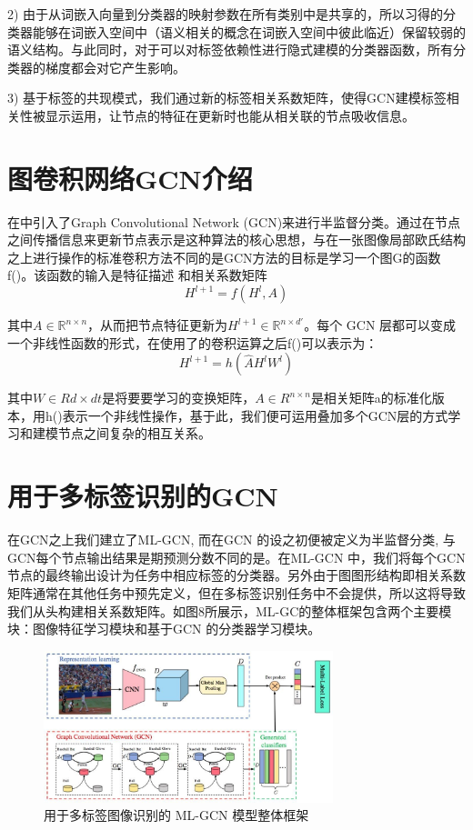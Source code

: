 2) 由于从词嵌入向量到分类器的映射参数在所有类别中是共享的，所以习得的分类器能够在词嵌入空间中（语义相关的概念在词嵌入空间中彼此临近）保留较弱的语义结构。与此同时，对于可以对标签依赖性进行隐式建模的分类器函数，所有分类器的梯度都会对它产生影响。

3) 基于标签的共现模式，我们通过新的标签相关系数矩阵，使得GCN建模标签相关性被显示运用，让节点的特征在更新时也能从相关联的节点吸收信息。

\section{图卷积网络GCN介绍}
在\cite{Li2014Multi}中引入了Graph Convolutional Network (GCN)来进行半监督分类。通过在节点之间传播信息来更新节点表示是这种算法的核心思想，与在一张图像局部欧氏结构之上进行操作的标准卷积方法不同的是GCN方法的目标是学习一个图G的函数f()。该函数的输入是特征描述  和相关系数矩阵
\begin{equation}
\label{dscNoStgProof0}
H^{l+1} = f(H^l, A)
\end{equation}

其中$A\in \mathbb{R}^{n\times n}$，从而把节点特征更新为$H^{l+1}\in \mathbb{R}^{n\times d'}$。每个 GCN 层都可以变成一个非线性函数的形式，在使用了\cite{Li2014Multi}的卷积运算之后f()可以表示为：
\begin{equation}
\label{dscNoStgProof0}
H^{l+1} = h(\hat{A}H^l W^l)
\end{equation}

其中$W\in Rd\times dt$是将要要学习的变换矩阵，$A\in R^{n\times n}$是相关矩阵a的标准化版本，用h()表示一个非线性操作，基于此，我们便可运用叠加多个GCN层的方式学习和建模节点之间复杂的相互关系。


\section{用于多标签识别的GCN}

在GCN之上我们建立了ML-GCN, 	而在GCN 的设之初便被定义为半监督分类, 与GCN每个节点输出结果是期预测分数不同的是。在ML-GCN 中，我们将每个GCN节点的最终输出设计为任务中相应标签的分类器。另外由于图图形结构即相关系数矩阵通常在其他任务中预先定义，但在多标签识别任务中不会提供，所以这将导致我们从头构建相关系数矩阵。如图8所展示，ML-GC的整体框架包含两个主要模块：图像特征学习模块和基于GCN 的分类器学习模块。

\begin{figure}[htbp!]
	\centering
	\includegraphics[width=0.75\textwidth]{figures/p3-1.jpg}
	\caption{用于多标签图像识别的 ML-GCN 模型整体框架}\label{fig:simuP1P2Result}
	\vspace{-1em}
\end{figure}

